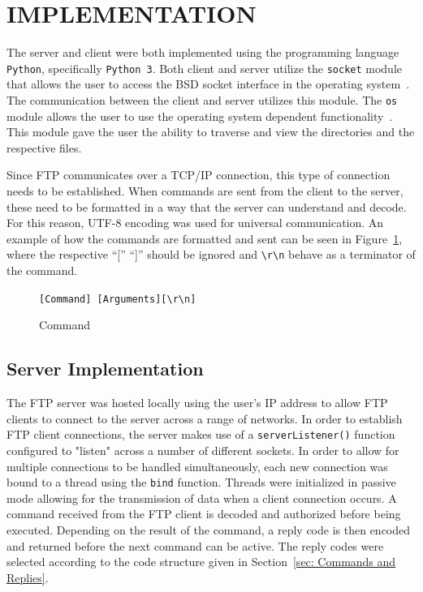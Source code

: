 \documentclass[10pt,twocolumn]{witseiepaper}
\def\code#1{\texttt{#1}}
\begin{document}
%
\section{IMPLEMENTATION}
\label{sec: Implementation}
The server and client were both implemented using the programming language \code{Python}, specifically \code{Python 3}. Both client and server utilize the \code{socket} module that allows the user to access the BSD socket interface in the operating system~\cite{socket}. The communication between the client and server utilizes this module. The \code{os} module allows the user to use the operating system dependent functionality~\cite{os}. This module gave the user the ability to traverse and view the directories and the respective files.

Since FTP communicates over a TCP/IP connection, this type of connection needs to be established. When commands are sent from the client to the server, these need to be formatted in a way that the server can understand and decode. For this reason, UTF-8 encoding was used for universal communication. An example of how the commands are formatted and sent can be seen in Figure~\ref{fig: Communication}, where the respective ``['' ``]'' should be ignored and \code{\textbackslash r\textbackslash n} behave as a terminator of the command.

\begin{figure}[h!]
\renewcommand{\thefigure}{\arabic{figure}}
\centering
\code{[Command]\ [Arguments][\textbackslash r\textbackslash n]}
\caption{Command}
\label{fig: Communication}
\end{figure}


\subsection{Server Implementation}
\label{sec: Server Implementation}
The FTP server was hosted locally using the user's IP address to allow FTP clients to connect to the server across a range of networks. In order to establish FTP client connections, the server makes use of a \texttt{serverListener()} function configured to "listen" across a number of different sockets. In order to allow for multiple connections to be handled simultaneously, each new connection was bound to a thread using the \texttt{bind} function. Threads were initialized in passive mode allowing for the transmission of data when a client connection occurs. A command received from the FTP client is decoded and authorized before being executed. Depending on the result of the command, a reply code is then encoded and returned before the next command can be active. The reply codes were selected according to the code structure given in Section~\ref{sec: Commands and Replies}.
\end{document}
